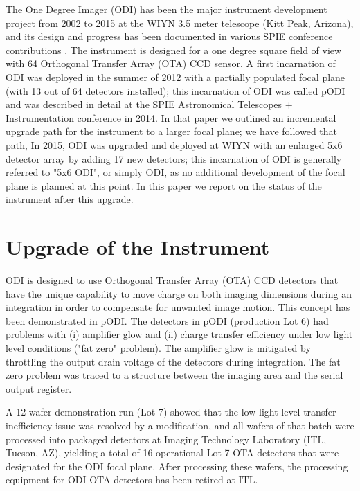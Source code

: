 \documentclass[]{spieman}
\begin{document}
The One Degree Imager (ODI) has been the major instrument development project
from 2002 to 2015 at the WIYN 3.5 meter telescope (Kitt Peak, Arizona), and its design and 
progress has been documented in various SPIE conference contributions
\cite{jacoby2002, Harbeck2008, Jacoby2008, Yeatts2008, Harbeck2010, Yeatts2010, 
harbeck2014, gopu2014}. The instrument is designed for a one degree  square 
field of view with 64 Orthogonal Transfer Array (OTA) CCD sensor. A first 
incarnation of ODI was deployed in the summer of 2012 with a partially 
populated focal plane (with 13 out of 64 detectors installed); this  
incarnation of ODI was called pODI and was described in detail at the SPIE 
Astronomical Telescopes + Instrumentation conference in 2014\cite{harbeck2014}. 
In that paper we outlined an incremental upgrade path for the instrument to a 
larger focal plane; we have followed that path, In 2015, ODI was upgraded and 
deployed at WIYN  with an enlarged 5x6  detector array by adding 17 new detectors;
this incarnation of ODI is generally  referred to "5x6 ODI", or simply ODI, as no
additional development of the focal plane is planned at this point. In this paper we report 
on the status of the instrument after this upgrade. 


\section{Upgrade of the Instrument} 

ODI is designed to use Orthogonal Transfer Array (OTA) CCD detectors that have the unique
capability to move charge on both imaging dimensions during an integration in order to compensate for 
unwanted image motion. This concept has been demonstrated in pODI.  The detectors in pODI (production Lot 6)
had problems with (i) amplifier glow and (ii)  charge transfer efficiency under low light level conditions 
("fat zero" problem). The amplifier glow is mitigated by throttling the output drain voltage of the detectors 
during integration. The fat zero problem was traced to a structure between the imaging area and the serial output register. 

A  12 wafer demonstration run (Lot 7) showed that the low light level transfer inefficiency issue was 
resolved by a modification\cite{harbeck2014}, and all wafers of that batch were processed 
into packaged detectors at Imaging Technology 
Laboratory (ITL, Tucson, AZ),  yielding a total of 16 operational  Lot 7 OTA detectors that were 
designated for the ODI focal plane. After  processing these wafers, the 
processing equipment for ODI OTA detectors has been retired at ITL. 
\end{document}
